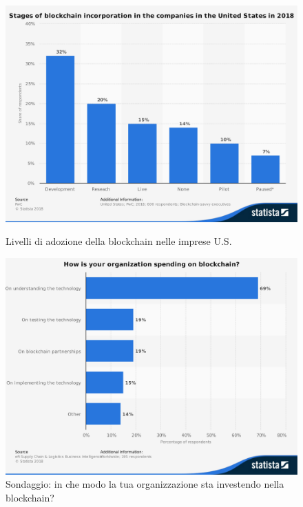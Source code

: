 \begin{figure}[H]
	\begin{minipage}{0.48\textwidth}
		\centering
		\includegraphics[width=1\linewidth]{images/chap_intro/stages-of-blockchain-incorporation.pdf}
		\caption{Livelli di adozione della blockchain nelle imprese U.S.
			\cite{stages-of-blockchain-incorporation}}
		\label{fig:stages-of-blockchain-incorporation}
	\end{minipage}
	\begin{minipage}{0.48\textwidth}
		\centering
		\includegraphics[width=1\linewidth]{images/chap_intro/top-spending-in-supply-chain-industry.pdf}
		\caption{Sondaggio: in che modo la tua organizzazione sta investendo nella blockchain?
			\cite{top-spending-in-supply-chain-industry}}
		\label{fig:top-spending-in-supply-chain-industry}
	\end{minipage}\hfill
\end{figure}

